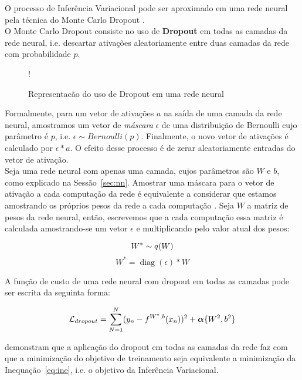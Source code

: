 O processo de Inferência Variacional pode ser aproximado em uma rede neural pela técnica do Monte Carlo Dropout \citep{dropbayes}. \\

O Monte Carlo Dropout consiste no uso de \textbf{Dropout} em todas as camadas da rede
neural, i.e. descartar ativações aleatoriamente entre duas camadas da rede com
probabilidade $p$.\\

\begin{figure}
  \centering
  \resizebox {\columnwidth} {!} {}
  \label{fig:dropout}
  \caption{Representacão do uso de Dropout em uma rede neural}
\end{figure}

Formalmente, para um vetor de ativações $a$ na saída de uma
camada da rede neural, amostramos um vetor de \textit{máscara} $\epsilon$ de uma
distribuição de Bernoulli cujo parâmetro é $p$, i.e. $\epsilon \sim Bernoulli(p)$.
Finalmente, o novo vetor de ativações é calculado por $\epsilon * a$. O efeito desse
processo é de zerar aleatoriamente entradas do vetor de ativação.
\\

Seja uma rede neural com apenas uma camada, cujos parâmetros são $W$ e $b$, como explicado na Sessão~\ref{sec:nn}. Amostrar uma máscara para o vetor de ativação a cada computação da rede é equivalente a considerar que estamos amostrando os próprios pesos da rede a cada computação \cite{dropbayes}. Seja $W$ a matriz de pesos da rede neural, então, escrevemos que a cada computação essa matriz é calculada amostrando-se um vetor $\epsilon$ e multiplicando pelo valor atual dos pesos: \\

\newcommand{\diag}{\mathop{\mathrm{diag}}}

$$    W^*   \sim \mathnormal{q}(W) $$
$$    W^*  = \diag(\epsilon) * W $$


A função de custo de uma rede neural com dropout em todas as camadas pode ser escrita da seguinta forma:

\[     \mathcal{L}_{dropout} = \sum^N_{N=1} (y_n - \mathnormal{f}^{W^*,b}(x_n))^2 + \boldsymbol{\alpha}\{W^2,b^2\} \]


\cite{dropbayes} demonstram que a aplicação do dropout em todas as camadas da rede faz com que a minimização
do objetivo de treinamento seja equivalente a minimização da Inequação~\ref{eq:ine}, i.e. o objetivo da Inferência Variacional.\\

